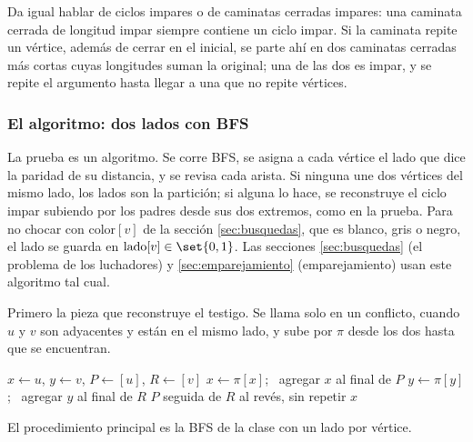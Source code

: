 \documentclass[11pt,letterpaper]{article}
\begin{document}
\begin{observacion}
  Da igual hablar de ciclos impares o de caminatas cerradas impares:
  una caminata cerrada de longitud impar siempre contiene un ciclo
  impar. Si la caminata repite un vértice, además de cerrar en el
  inicial, se parte ahí en dos
  caminatas cerradas más cortas cuyas longitudes suman la original;
  una de las dos es impar, y se repite el argumento hasta llegar a
  una que no repite vértices.
\end{observacion}

\subsubsection*{El algoritmo: dos lados con BFS}

La prueba es un algoritmo. Se corre BFS, se asigna a cada vértice el
lado que dice la paridad de su distancia, y se revisa cada arista. Si
ninguna une dos vértices del mismo lado, los lados son la partición;
si alguna lo hace, se reconstruye el ciclo impar subiendo por los
padres desde sus dos extremos, como en la prueba. Para no chocar con
$\text{color}[v]$ de la sección \ref{sec:busquedas}, que es blanco,
gris o negro, el lado se guarda en $\text{lado}[v] \in \set{0, 1}$.
Las secciones \ref{sec:busquedas} (el problema de los luchadores) y
\ref{sec:emparejamiento} (emparejamiento) usan este algoritmo tal
cual.

Primero la pieza que reconstruye el testigo. Se llama solo en un
conflicto, cuando $u$ y $v$ son adyacentes y están en el mismo
lado, y sube por $\pi$ desde los dos hasta que se encuentran.

\begin{algorithm}[H]
\caption{\textsc{Ciclo-Impar}$(u, v)$: el testigo de que no es
         bipartito}
\label{alg:bipartito-ciclo-impar}
\begin{algorithmic}[1]
 
  \State $x \gets u$, \quad $y \gets v$, \quad $P \gets [u]$, \quad
         $R \gets [v]$
   
    \State $x \gets \pi[x]$; \ agregar $x$ al final de $P$
    \State $y \gets \pi[y]$; \ agregar $y$ al final de $R$
  \EndWhile
  \State \Return $P$ seguida de $R$ al revés, sin repetir $x$
\EndProcedure
\end{algorithmic}
\end{algorithm}

El procedimiento principal es la BFS de la clase con un lado por
vértice.
\end{document}
